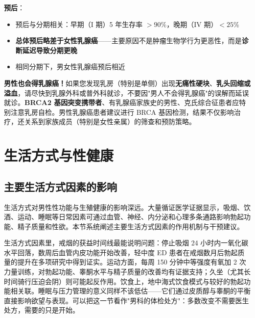 \documentclass[12pt,a4paper,twoside]{ctexbook}
\begin{document}
\vspace{0.5em}
\noindent\textbf{预后}：

\begin{itemize}[leftmargin=2cm]
	\item 预后与分期相关：早期（I 期）5 年生存率 $>90\%$，晚期（IV 期）$<25\%$
	\item \textbf{总体预后略差于女性乳腺癌}——主要原因不是肿瘤生物学行为更恶性，而是\textbf{诊断延迟导致分期更晚}
	\item 相同分期下，男女性乳腺癌预后相近
\end{itemize}

\begin{tcolorbox}[colback=pink!5!white,colframe=red!50!black,title=贴心小叮咛]
\textbf{男性也会得乳腺癌！}如果您发现乳房（特别是单侧）出现\textbf{无痛性硬块}、\textbf{乳头回缩或溢血}，请尽快到乳腺外科或普外科就诊，不要因"男人不会得乳腺癌"的误解而延误就诊。\textbf{BRCA2 基因突变携带者}、有乳腺癌家族史的男性、克氏综合征患者应特别注意乳房自检。男性乳腺癌患者建议进行 BRCA 基因检测，结果不仅影响治疗，还关系到家族成员（特别是女性亲属）的筛查和预防策略。
\end{tcolorbox}

\chapter{生活方式与性健康}

\section{主要生活方式因素的影响}


生活方式对男性性功能与生殖健康的影响深远。大量循证医学证据显示，吸烟、饮酒、运动、睡眠等日常因素可通过血管、神经、内分泌和心理多条通路影响勃起功能、精子质量和性欲。本节系统阐述主要生活方式因素的作用机制与干预建议。


生活方式因素里，戒烟的获益时间线最能说明问题：停止吸烟 24 小时内一氧化碳水平回落，数周后血管内皮功能开始改善，轻中度 ED 患者在戒烟数月后勃起质量的提升在多项研究中得到证实。运动方面，每周 150 分钟中等强度有氧加 2 次力量训练，对勃起功能、睾酮水平与精子质量的改善均有证据支持；久坐（尤其长时间骑行压迫会阴）则可能起反作用。饮食上，地中海式饮食模式与较好的勃起功能相关联。睡眠与压力管理的意义同样不该低估——它们通过皮质醇与睾酮的平衡直接影响欲望与表现。可以把这一节看作"男科的体检处方"：多数改变不需要医生处方，需要的只是开始。
\end{document}
